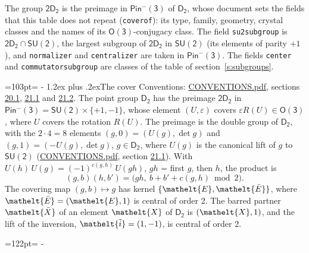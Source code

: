 \documentclass[10pt,a4paper]{article}
\makeatletter
\renewcommand\section{\@startsection{section}{1}{\z@}{-3ex plus -1ex minus -.2ex}%
  {1.2ex plus .2ex}{\normalfont\large\sffamily\bfseries\color{parttitle}}}
\newcommand{\needspace}[1]{\par\penalty-100\begingroup\dimen0=#1\relax\dimen2=\pagegoal
  \advance\dimen2-\pagetotal\ifdim\dimen0>\dimen2\relax\ifdim\dimen2>0pt\vfil\break\fi\fi
  \endgroup}
\numberwithin{equation}{section}
\newcommand{\eltfont}[1]{{\let\sigma\eltsigma\mathelt{#1}}}
\newcommand{\grp}[1]{\mathsf{#1}}
\newcommand{\elt}[1]{\eltfont{#1}}
\newcommand{\dirprod}{\times}
\newcommand{\barred}[1]{\bar{#1}}
\newcommand{\lift}[1]{\tilde{#1}}
\makeatother
\begin{document}
\leavevmode\label{n:element.inversion}\label{n:group.preimage}The group $\grp{2D_{2}}$ is the preimage in $\grp{Pin^{-}(3)}$ of \href{../../../rotation/data/pdf/D2.pdf}{$\grp{D_{2}}$}, whose document sets the fields that this table does not repeat (\texttt{coverof}): its type, family, geometry, crystal classes and the names of its \href{../../../rotation/data/pdf/O3.pdf}{$\grp{O(3)}$}-conjugacy class. The field \texttt{su2subgroup} is $\grp{2D_{2}} \cap \grp{SU(2)}$, the largest subgroup of $\grp{2D_{2}}$ in $\grp{SU(2)}$ (its elements of parity $+1$), and \texttt{normalizer} and \texttt{centralizer} are taken in $\grp{Pin^{-}(3)}$. The fields \texttt{center} and \texttt{commutatorsubgroup} are classes of the table of section~\ref{s:subgroups}.
\needspace{103pt}
\section{The cover}\label{s:cover}
Conventions: \href{../../CONVENTIONS.pdf}{CONVENTIONS.pdf}, sections \href{../../CONVENTIONS.pdf\#conv.20.1}{20.1}, \href{../../CONVENTIONS.pdf\#conv.21.1}{21.1} and \href{../../CONVENTIONS.pdf\#conv.21.2}{21.2}.
\leavevmode\label{n:group.pin.minus}\label{n:group.su2}\label{n:local.pin.sign}\label{n:matrix.covered}\label{n:matrix.lift.su2}\label{n:index.bar}The point group $\grp{D_{2}}$ has the preimage $\grp{2D_{2}}$ in $\grp{Pin^{-}(3)} = \grp{SU(2)} \dirprod \{+1, -1\}$, whose element $(U, \varepsilon)$ covers $\varepsilon R(U) \in \grp{O(3)}$, where $U$ covers the rotation $R(U)$. The preimage is the double group of $\grp{D_{2}}$, with the $2 \cdot 4 = 8$ elements $(g, 0) = (U(g), \det g)$ and $(g, 1) = (-U(g), \det g)$, $g \in \grp{D_{2}}$, where $U(g)$ is the canonical lift of $g$ to $\grp{SU(2)}$ (\href{../../CONVENTIONS.pdf}{CONVENTIONS.pdf}, section \href{../../CONVENTIONS.pdf\#conv.21.1}{21.1}). \label{n:function.cocycle}With $U(h)\,U(g) = (-1)^{c(g,h)}\,U(gh)$, $gh$ = first $g$, then $h$, the product is
\begin{equation}\label{e:product}(g, b)(h, b') = \bigl(gh,\ b + b' + c(g, h) \bmod 2\bigr).\end{equation}
\leavevmode\label{n:mark.bar}The covering map $(g, b) \mapsto g$ has kernel $\{\elt{E}, \elt{\barred{E}}\}$, where $\elt{\barred{E}} = (\elt{E}, 1)$ is central of order 2. \label{n:element.named}\label{n:mark.lift}The barred partner $\elt{\barred{X}}$ of an element $\elt{X}$ of $\grp{D_{2}}$ is $(\elt{X}, 1)$, and the lift of the inversion, $\elt{\lift{i}} = (1, -1)$, is central of order 2.
\needspace{122pt}
\end{document}
